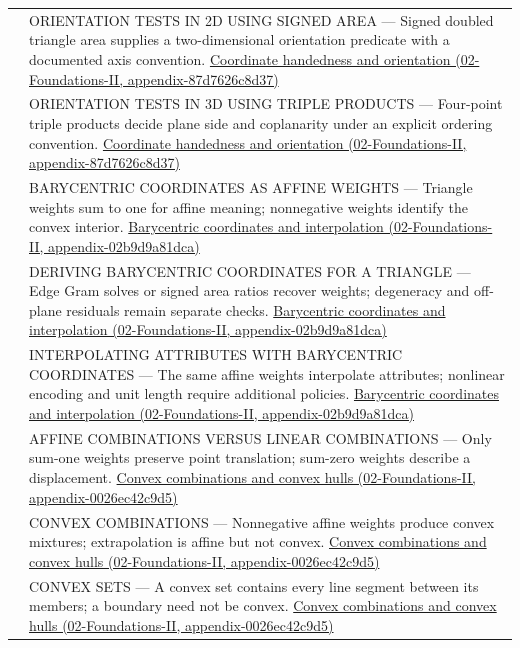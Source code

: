 {\begin{longtable}[]{@{}
  >{\raggedright\arraybackslash}p{}
  >{\raggedright\arraybackslash}p{}@{}}
566 & ORIENTATION TESTS IN 2D USING SIGNED AREA --- Signed doubled triangle area supplies a two-dimensional orientation predicate with a documented axis convention. \href{../02-Foundations-II/main.pdf\#nameddest=appendix-87d7626c8d37}{Coordinate handedness and orientation (02-Foundations-II, appendix-87d7626c8d37)} \\
567 & ORIENTATION TESTS IN 3D USING TRIPLE PRODUCTS --- Four-point triple products decide plane side and coplanarity under an explicit ordering convention. \href{../02-Foundations-II/main.pdf\#nameddest=appendix-87d7626c8d37}{Coordinate handedness and orientation (02-Foundations-II, appendix-87d7626c8d37)} \\
568 & BARYCENTRIC COORDINATES AS AFFINE WEIGHTS --- Triangle weights sum to one for affine meaning; nonnegative weights identify the convex interior. \href{../02-Foundations-II/main.pdf\#nameddest=appendix-02b9d9a81dca}{Barycentric coordinates and interpolation (02-Foundations-II, appendix-02b9d9a81dca)} \\
569 & DERIVING BARYCENTRIC COORDINATES FOR A TRIANGLE --- Edge Gram solves or signed area ratios recover weights; degeneracy and off-plane residuals remain separate checks. \href{../02-Foundations-II/main.pdf\#nameddest=appendix-02b9d9a81dca}{Barycentric coordinates and interpolation (02-Foundations-II, appendix-02b9d9a81dca)} \\
570 & INTERPOLATING ATTRIBUTES WITH BARYCENTRIC COORDINATES --- The same affine weights interpolate attributes; nonlinear encoding and unit length require additional policies. \href{../02-Foundations-II/main.pdf\#nameddest=appendix-02b9d9a81dca}{Barycentric coordinates and interpolation (02-Foundations-II, appendix-02b9d9a81dca)} \\
571 & AFFINE COMBINATIONS VERSUS LINEAR COMBINATIONS --- Only sum-one weights preserve point translation; sum-zero weights describe a displacement. \href{../02-Foundations-II/main.pdf\#nameddest=appendix-0026ec42c9d5}{Convex combinations and convex hulls (02-Foundations-II, appendix-0026ec42c9d5)} \\
572 & CONVEX COMBINATIONS --- Nonnegative affine weights produce convex mixtures; extrapolation is affine but not convex. \href{../02-Foundations-II/main.pdf\#nameddest=appendix-0026ec42c9d5}{Convex combinations and convex hulls (02-Foundations-II, appendix-0026ec42c9d5)} \\
573 & CONVEX SETS --- A convex set contains every line segment between its members; a boundary need not be convex. \href{../02-Foundations-II/main.pdf\#nameddest=appendix-0026ec42c9d5}{Convex combinations and convex hulls (02-Foundations-II, appendix-0026ec42c9d5)} \\

\end{longtable}}
